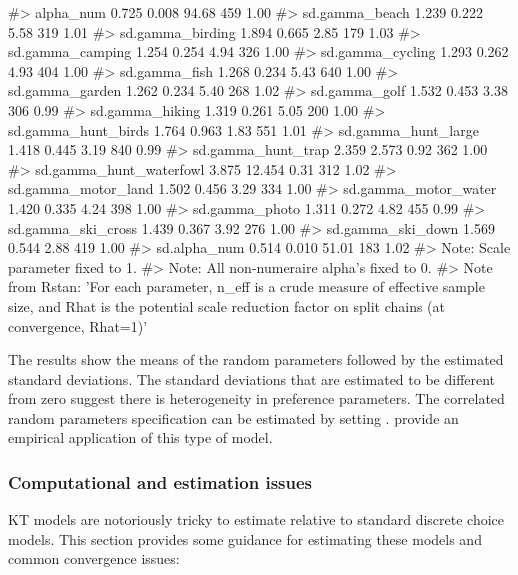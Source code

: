 \begin{Schunk}
\begin{Soutput}
#> alpha_num                  0.725   0.008  94.68   459 1.00
#> sd.gamma_beach             1.239   0.222   5.58   319 1.01
#> sd.gamma_birding           1.894   0.665   2.85   179 1.03
#> sd.gamma_camping           1.254   0.254   4.94   326 1.00
#> sd.gamma_cycling           1.293   0.262   4.93   404 1.00
#> sd.gamma_fish              1.268   0.234   5.43   640 1.00
#> sd.gamma_garden            1.262   0.234   5.40   268 1.02
#> sd.gamma_golf              1.532   0.453   3.38   306 0.99
#> sd.gamma_hiking            1.319   0.261   5.05   200 1.00
#> sd.gamma_hunt_birds        1.764   0.963   1.83   551 1.01
#> sd.gamma_hunt_large        1.418   0.445   3.19   840 0.99
#> sd.gamma_hunt_trap         2.359   2.573   0.92   362 1.00
#> sd.gamma_hunt_waterfowl    3.875  12.454   0.31   312 1.02
#> sd.gamma_motor_land        1.502   0.456   3.29   334 1.00
#> sd.gamma_motor_water       1.420   0.335   4.24   398 1.00
#> sd.gamma_photo             1.311   0.272   4.82   455 0.99
#> sd.gamma_ski_cross         1.439   0.367   3.92   276 1.00
#> sd.gamma_ski_down          1.569   0.544   2.88   419 1.00
#> sd.alpha_num               0.514   0.010  51.01   183 1.02
#> Note: Scale parameter fixed to 1. 
#> Note: All non-numeraire alpha's fixed to 0. 
#> Note from Rstan: 'For each parameter, n_eff is a crude measure of effective sample size, and Rhat is the potential scale reduction factor on split chains (at convergence, Rhat=1)'
\end{Soutput}
\end{Schunk}

The results show the means of the random parameters followed by the
estimated standard deviations. The standard deviations that are
estimated to be different from zero suggest there is heterogeneity in
preference parameters. The correlated random parameters specification
can be estimated by setting .
\citet{bhathousehold2006} provide an empirical application of this type
of model.

\hypertarget{computational-and-estimation-issues}{%
\subsubsection{Computational and estimation
issues}\label{computational-and-estimation-issues}}

KT models are notoriously tricky to estimate relative to standard
discrete choice models. This section provides some guidance for
estimating these models and common convergence issues:

